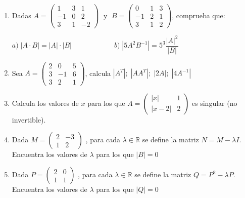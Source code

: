 \begin{enumerate}
\rightline{\textcolor{gris}{Solución: $x=1\; \wedge \;  x=-1$.}}

\item Dadas $A=\left( \begin{matrix} 1&3&1\\-1&0&2\\3&1&-2 \end{matrix} \right) \; \text{ y } \; B=\left( \begin{matrix} 0&1&3\\-1&2&1\\3&1&2  \end{matrix} \right)$, comprueba que: 

$a)\; |A\cdot B|=|A|\cdot |B|\qquad \qquad \qquad b)\; |5A^2B^{-1}|=5^3\dfrac{|A|^2}{|B|}$ 

\rightline{\textcolor{gris}{Solución: Sí; $\qquad$ Sí.}}


\item Sea $A=\left( \begin{matrix} 2&0&5\\3&-1&6\\3&2&1 \end{matrix} \right)$, calcula $|A^T|; \; |AA^T|; \; |2A|; \; |4A^{-1}|$

\rightline{\textcolor{gris}{Solución: $19; \; 19^2; \; 152; \; 64/19$.}}

\item Calcula los valores de $x$ para los que $A=\left( \begin{matrix}  |x|&1\\|x-2|&2\end{matrix} \right)$ es singular (no invertible).

\rightline{\textcolor{gris}{Solución: $-2; \; 2/3$.}}

\item Dada $M=\left( \begin{matrix}  2&-3\\1&2 \end{matrix} \right)$ , para cada $\lambda \in \mathbb R$ se define la matriz $N=M-\lambda I$. Encuentra los valores de $\lambda$ para los que $|B|=0$

\rightline{\textcolor{gris}{Solución: $\lambda=\pm 1$.}}

\item Dada $P=\left( \begin{matrix}  2&0\\1&1 \end{matrix} \right)$ , para cada $\lambda \in \mathbb R$ se define la matriz $Q=P^2-\lambda P$. Encuentra los valores de $\lambda$ para los que $|Q|=0$


\end{enumerate}
